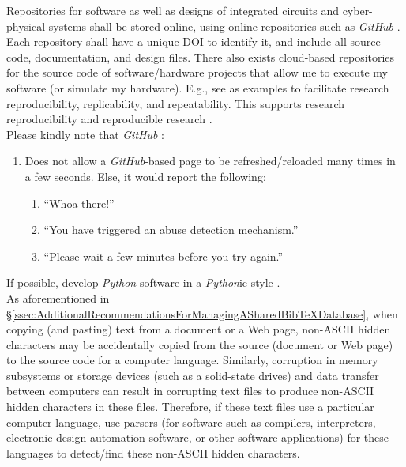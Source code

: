 \documentclass[letter,12pt]{article}
\begin{document}
Repositories for software as well as designs of integrated circuits and cyber-physical systems shall be stored online, using online repositories such as {\it GitHub} \cite{GitHubStaff2016}. Each repository shall have a unique DOI to identify it, and include all source code, documentation, and design files. There also exists cloud-based repositories for the source code of software/hardware projects that allow me to execute my software (or simulate my hardware). E.g., see \cite{CodeOceanStaff2017,RunMyCodeAssociationContributors2013} as examples to facilitate research reproducibility, replicability, and repeatability. This supports research reproducibility and reproducible research \cite{Schiermeier2018,Baumer2017,CodeOceanStaff2017,DatopianAtomaticLtdIncStaff2017,Kim2017,Mailund2017,Barba2016,Gandrud2015,Liberman2015,Creswell2014,Gandrud2014,Stodden2014,RunMyCodeAssociationContributors2013,Blackburn20XY,Geier20XY,Krishnamurthi20XY}. \\

Please kindly note that {\it GitHub} \cite{GitHubStaff2016}: \vspace{-0.3cm}
\begin{enumerate} \itemsep -4pt
\item Does not allow a {\it GitHub}-based page to be refreshed/reloaded many times in a few seconds. Else, it would report the following: \vspace{-0.3cm}
	\begin{enumerate} \itemsep -2pt
	\item ``Whoa there!''
	\item ``You have triggered an abuse detection mechanism.''
	\item ``Please wait a few minutes before you try again.''
	\end{enumerate}
\end{enumerate}



If possible, develop {\it Python} software in a {\it Python}ic style \cite[Chapter 1, pp. 1--12,12--17]{Alchin2010} \cite{Jon2014,Reitz2016a,Reitz2016,Preshing2014,Franca2014,vanRossum2013}. \\



As aforementioned in \S\ref{ssec:AdditionalRecommendationsForManagingASharedBibTeXDatabase}, when copying (and pasting) text from a document or a Web page, non-ASCII hidden characters may be accidentally copied from the source (document or Web page) to the source code for a computer language. Similarly, corruption in memory subsystems or storage devices (such as a solid-state drives) and data transfer between computers can result in corrupting text files to produce non-ASCII hidden characters in these files. Therefore, if these text files use a particular computer language, use parsers (for software such as compilers, interpreters, electronic design automation software, or other software applications) for these languages to detect/find these non-ASCII hidden characters. \\
\end{document}
